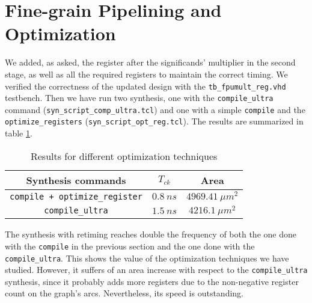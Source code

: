 \section{Fine-grain Pipelining and Optimization}

We added, as asked, the register after the significands' multiplier in the second stage, as well as all the required registers
to maintain the correct timing. We verified the correctness of the updated design with the \verb|tb_fpumult_reg.vhd| testbench.
Then we have run two synthesis, one with the \verb|compile_ultra| command (\verb|syn_script_comp_ultra.tcl|) and one with a simple
\verb|compile| and the \verb|optimize_registers| (\verb|syn_script_opt_reg.tcl|). The results are summarized in table \ref{tab:ex1.1}.

\begin{table}[!ht]
    \centering
    \begin{tabular}{ |c|c|c| }
        \hline
        Synthesis commands & $T_{ck}$ & Area \\
        \hline
        \verb|compile + optimize_register| & $0.8\ ns$ & $4969.41\ \mu m^2$ \\
        \hline
        \verb|compile_ultra| & $1.5\ ns$ & $4216.1\ \mu m^2$ \\
        \hline
    \end{tabular}
    \caption{Results for different optimization techniques}
    \label{tab:ex1.1}
\end{table}

The synthesis with retiming reaches double the frequency of both the one done with the \verb|compile| in the previous section and the one
done with the \verb|compile_ultra|. This shows the value of the optimization techniques we have studied. However, it suffers of an area
increase with respect to the \verb|compile_ultra| synthesis, since it probably adds more registers due to the non-negative register count
on the graph's arcs. Nevertheless, its speed is outstanding.
